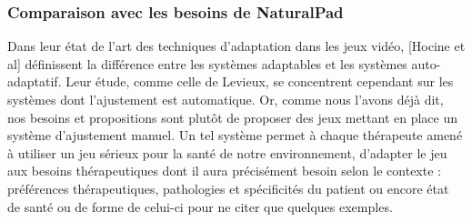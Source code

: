 	\subsubsection*{Comparaison avec les besoins de NaturalPad}
Dans leur état de l'art des techniques d'adaptation dans les jeux vidéo, [Hocine et al] définissent la différence entre les systèmes adaptables et les systèmes auto-adaptatif. Leur étude, comme celle de Levieux, se concentrent cependant sur les systèmes dont l'ajustement est automatique. Or, comme nous l'avons déjà dit, nos besoins et propositions sont plutôt de proposer des jeux mettant en place un système d'ajustement manuel. Un tel système permet à chaque thérapeute amené à utiliser un jeu sérieux pour la santé de notre environnement, d'adapter le jeu aux besoins thérapeutiques dont il aura précisément besoin selon le contexte : préférences thérapeutiques, pathologies et spécificités du patient ou encore état de santé ou de forme de celui-ci pour ne citer que quelques exemples.